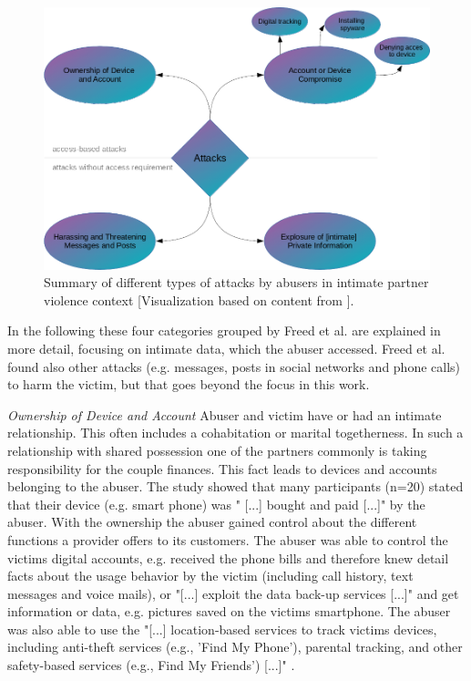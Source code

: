 \begin{figure}[htb]
	\centering
	\includegraphics[width=\linewidth]{img/abusing_categories.png}
	\caption{Summary of different types of attacks by abusers in intimate partner violence context [Visualization based on content from \cite{freed2018stalker}].}
	\label{fig:abusing_categories}
\end{figure}
In the following these four categories grouped by Freed et al. \cite{freed2018stalker} are explained in more detail, focusing on intimate data, which the abuser accessed. Freed et al. found also other attacks (e.g. messages, posts in social networks and phone calls) to harm the victim, but that goes beyond the focus in this work.

\textit{Ownership of Device and Account}
Abuser and victim have or had an intimate relationship. This often includes a cohabitation or  marital togetherness. In such a relationship with shared possession one of the partners commonly is taking responsibility for the couple finances. This fact leads to devices and accounts belonging to the abuser.
The study showed that many participants (n=20) stated that their device (e.g. smart phone) was " [...] bought and paid [...]" by the abuser. 
With the ownership the abuser gained control about the different functions a provider offers to its customers. The abuser was able to control the victims digital accounts, e.g. received the phone bills and therefore knew detail facts about the usage behavior by the victim (including call history, text messages and voice mails), or "[...] exploit the data back-up services [...]" and get information or data, e.g. pictures saved on the victims smartphone. The abuser was also able to use the "[...] location-based services to track victims devices, including anti-theft services (e.g., 'Find My Phone'), parental tracking, and other safety-based services (e.g., Find My Friends') [...]" \cite{freed2018stalker}.

